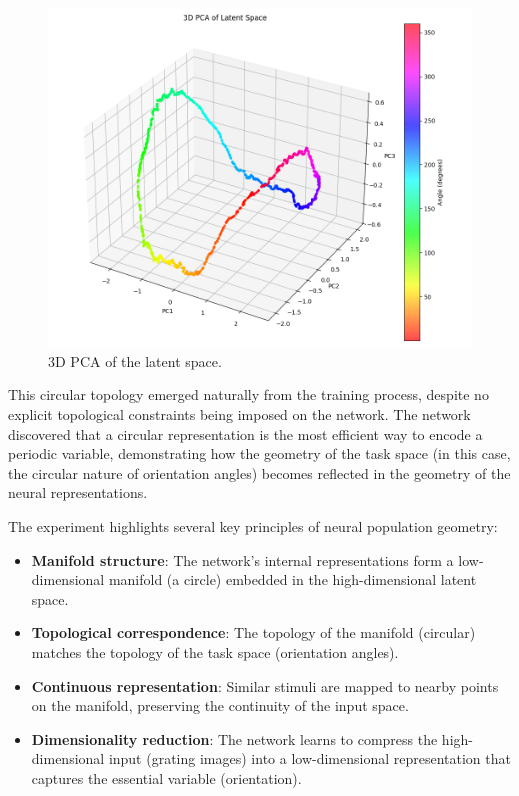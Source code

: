 \documentclass[11pt,a4paper]{article}
\begin{document}
\begin{figure}[h]
    \centering
    \includegraphics[width=0.8\linewidth]{results/3d_manifold.png}
    \caption{3D PCA of the latent space.}
    \label{fig:3d_manifold}
\end{figure}

This circular topology emerged naturally from the training process, despite no explicit topological constraints being imposed on the network. The network discovered that a circular representation is the most efficient way to encode a periodic variable, demonstrating how the geometry of the task space (in this case, the circular nature of orientation angles) becomes reflected in the geometry of the neural representations.

The experiment highlights several key principles of neural population geometry:

\begin{itemize}
    \item \textbf{Manifold structure}: The network's internal representations form a low-dimensional manifold (a circle) embedded in the high-dimensional latent space.
    \item \textbf{Topological correspondence}: The topology of the manifold (circular) matches the topology of the task space (orientation angles).
    \item \textbf{Continuous representation}: Similar stimuli are mapped to nearby points on the manifold, preserving the continuity of the input space.
    \item \textbf{Dimensionality reduction}: The network learns to compress the high-dimensional input (grating images) into a low-dimensional representation that captures the essential variable (orientation).
\end{itemize}
\end{document}
